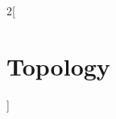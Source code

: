 \documentclass[../../../main.tex]{subfiles}
\begin{document}
\begin{multicols}{2}[\section{Topology}]

\end{multicols}
\end{document}
